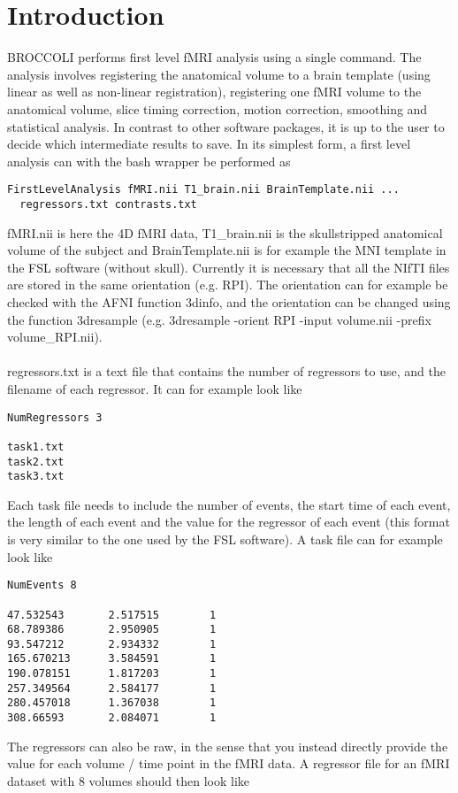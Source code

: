 \section{Introduction}

BROCCOLI performs first level fMRI analysis using a single command. The analysis involves registering the anatomical volume to a brain template (using linear as well as non-linear registration), registering one fMRI volume to the anatomical volume, slice timing correction, motion correction, smoothing and statistical analysis. In contrast to other software packages, it is up to the user to decide which intermediate results to save. In its simplest form, a first level analysis can with the bash wrapper be performed as

\begin{verbatim}
FirstLevelAnalysis fMRI.nii T1_brain.nii BrainTemplate.nii ... 
  regressors.txt contrasts.txt 
\end{verbatim}
fMRI.nii is here the 4D fMRI data, T1\_brain.nii is the skullstripped anatomical volume of the subject and BrainTemplate.nii is for example the MNI template in the FSL software (without skull). Currently it is necessary that all the NIfTI files are stored in the same orientation (e.g. RPI). The orientation can for example be checked with the AFNI function 3dinfo, and the orientation can be changed using the function 3dresample (e.g. 3dresample -orient RPI -input volume.nii -prefix volume\_RPI.nii). \\ \\ regressors.txt is a text file that contains the number of regressors to use, and the filename of each regressor. It can for example look like

\begin{verbatim}
NumRegressors 3

task1.txt
task2.txt
task3.txt
\end{verbatim}
Each task file needs to include the number of events, the start time of each event, the length of each event and the value for the regressor of each event (this format is very similar to the one used by the FSL software). A task file can for example look like

\begin{verbatim}
NumEvents 8

47.532543       2.517515        1
68.789386       2.950905        1
93.547212       2.934332        1
165.670213      3.584591        1
190.078151      1.817203        1
257.349564      2.584177        1
280.457018      1.367038        1
308.66593       2.084071        1
\end{verbatim}
The regressors can also be raw, in the sense that you instead directly provide the value for each volume / time point in the fMRI data. A regressor file for an fMRI dataset with 8 volumes should then look like

